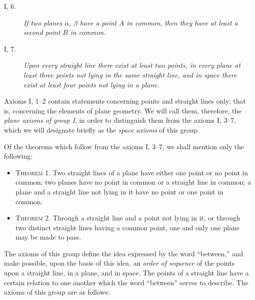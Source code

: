 \documentclass[11pt,oneside]{book}
\begin{document}
\begin{description}
\item[I, 6.] \emph{If two planes $\alpha$, $\beta$ have a point $A$ in common,
then they have at least a second point $B$ in common.}

\item[I, 7.] \emph{Upon every straight line there exist at least two
points, in every plane at least three points not
lying in the same straight line, and in space there
exist at least four points not lying in a plane.}
\end{description}

Axioms I, 1--2 contain statements concerning points
and straight lines only; that is, concerning the elements
of plane geometry. We will call them, therefore,
the \emph{plane axioms of group I}, in order to distinguish
them from the axioms I, 3--7, which we will
designate briefly as the \emph{space axioms} of this group.

Of the theorems which follow from the axioms
I, 3--7, we shall mention only the following:

\begin{itemize}
\item[]{\scshape Theorem 1.} Two straight lines of a plane have
either one point or no point in common; two
planes have no point in common or a straight
line in common; a plane and a straight line
not lying in it have no point or one point in
common.

\item[]{\scshape Theorem 2.} Through a straight line and a point
not lying in it, or through two distinct straight
lines having a common point, one and only one
plane may be made to pass.
\end{itemize}

\label{p3}

The axioms of this group define the idea expressed
by the word ``between,'' and make possible, upon the
basis of this idea, an \emph{order of sequence} of the points
upon a straight line, in a plane, and in space. The
points of a straight line have a certain relation to one
another which the word ``between'' serves to describe.
The axioms of this group are as follows:
\end{document}
